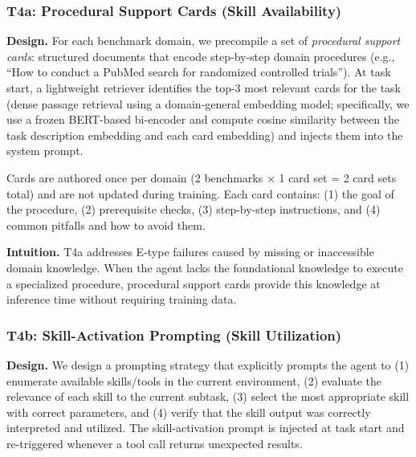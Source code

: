 
\subsubsection{T4a: Procedural Support Cards (Skill Availability)}
\label{sec:recipes:proc:cards}

\textbf{Design.} For each benchmark domain, we precompile a set of \emph{procedural support cards}: structured documents that encode step-by-step domain procedures (e.g., ``How to conduct a PubMed search for randomized controlled trials''). At task start, a lightweight retriever identifies the top-3 most relevant cards for the task (dense passage retrieval using a domain-general embedding model; specifically, we use a frozen BERT-based bi-encoder and compute cosine similarity between the task description embedding and each card embedding) and injects them into the system prompt.

Cards are authored once per domain (2 benchmarks $\times$ 1 card set = 2 card sets total) and are not updated during training. Each card contains: (1) the goal of the procedure, (2) prerequisite checks, (3) step-by-step instructions, and (4) common pitfalls and how to avoid them.

\textbf{Intuition.} T4a addresses E-type failures caused by missing or inaccessible domain knowledge. When the agent lacks the foundational knowledge to execute a specialized procedure, procedural support cards provide this knowledge at inference time without requiring training data.


\subsubsection{T4b: Skill-Activation Prompting (Skill Utilization)}
\label{sec:recipes:proc:activation}

\textbf{Design.} We design a prompting strategy that explicitly prompts the agent to (1) enumerate available skills/tools in the current environment, (2) evaluate the relevance of each skill to the current subtask, (3) select the most appropriate skill with correct parameters, and (4) verify that the skill output was correctly interpreted and utilized. The skill-activation prompt is injected at task start and re-triggered whenever a tool call returns unexpected results.

